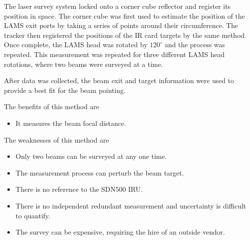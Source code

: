 \documentclass[12pt,twoside,english]{article}\usepackage[]{graphicx}\usepackage[]{color}
\begin{document}
The laser survey system locked onto a corner cube reflector and register its position in space. The corner cube was first used to estimate the position of the LAMS exit ports by taking a series of points around their circumference. The tracker then registered the positions of the IR card targets by the same method. Once complete, the LAMS head was rotated by $120^{\circ}$ and the process was repeated. This measurement was repeated for three different LAMS head rotations, where two beams were surveyed at a time. 

After data was collected, the beam exit and target information were used to provide a best fit for the beam pointing. 

The benefits of this method are  
\begin{itemize}
\item It measures the beam focal distance. 

\end{itemize}

The weaknesses of this method are  
\begin{itemize}
\item Only two beams can be surveyed at any one time. 

\item The measurement process can perturb the beam target. 

\item There is no reference to the SDN500 IRU. 

\item There is no independent redundant measurement and uncertainty is difficult to quantify. 

\item The survey can be expensive, requiring the hire of an outside vendor.  
\end{itemize}



\end{document}
